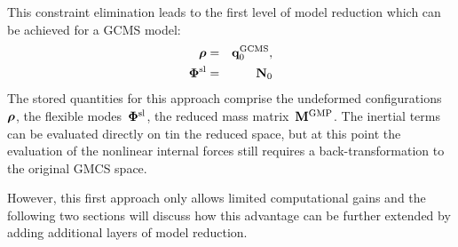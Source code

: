 This constraint elimination leads to the first level of model reduction which can be achieved for a GCMS model:
\begin{eqnarray}
\bm \rho &=& \mathbf q^{\rm GCMS}_0, \\
\bm \Phi^{\rm sl} &=& \mathbf N_0
\end{eqnarray}
The stored quantities for this approach comprise the undeformed configurations~$\bm \rho$, the flexible modes~$\bm \Phi^{\rm sl}$, the reduced mass matrix~$\mathbf M^{\rm GMP}$.
The inertial terms can be evaluated directly on tin the reduced space, but at this point the evaluation of the nonlinear internal forces still requires a back-transformation to the original GMCS space. 

However, this first approach only allows limited computational gains and the following two sections will discuss how this advantage can be further extended by adding additional layers of model reduction. 


